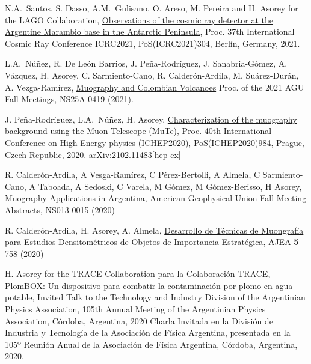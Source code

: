 \begin{etaremune}
\item {} N.A.\ Santos, S. Dasso, A.M.\ Gulisano, O. Areso, M. Pereira and H. Asorey for the LAGO Collaboration, \href{https://doi.org/10.22323/1.395.304}{Observations of the cosmic ray detector at the Argentine Marambio base in the Antarctic Peninsula}, \en Proc.
37th International Cosmic Ray Conference ICRC2021, PoS(ICRC2021)304, Berlín, Germany, 2021.

\item {} L.A.\ Núñez, R. De León Barrios, J. Peña-Rodríguez, J. Sanabria-Gómez, A. Vázquez, H. Asorey, C. Sarmiento-Cano, R. Calderón-Ardila, M. Suárez-Durán, A. Vezga-Ramírez, \href{https://ui.adsabs.harvard.edu/abs/2021AGUFMNS25A0419N}{Muography and Colombian Volcanoes} \in Proc. of the 2021 AGU Fall Meetings, NS25A-0419 (2021).

\item {} J. Peña-Rodríguez, L.A.\ Núñez, H. Asorey, \href{https://doi.org/10.22323/1.390.0984}{Characterization of the muography background using the Muon Telescope (MuTe)}, \en Proc.
40th International Conference on High Energy physics (ICHEP2020), PoS(ICHEP2020)984, Prague,  Czech Republic, 2020. \href{http://arxiv.org/abs/2102.11483}{arXiv:2102.11483}[hep-ex]

\item {} R. Calderón-Ardila, A Vesga-Ramírez, C Pérez-Bertolli, A Almela, C Sarmiento-Cano, A Taboada, A Sedoski, C Varela, M Gómez, M Gómez-Berisso, H Asorey, \href{https://ui.adsabs.harvard.edu/abs/2020AGUFMNS0130015C/abstract}{Muography Applications in Argentina}, American Geophysical Union Fall Meeting Abstracts, NS013-0015 (2020)

\item {} R. Calderón-Ardila, H. Asorey, A. Almela, \href{https://doi.org/10.33414/ajea.5.758.2020}{Desarrollo de Técnicas de Muongrafía para Estudios Densitométricos de Objetos de Importancia Estratégica}, AJEA {\textbf{5}} 758 (2020)

\item {} H. Asorey \ifeng for the TRACE Collaboration \else para la Colaboración TRACE\fi, PlomBOX: Un dispositivo para combatir la contaminación por plomo en agua potable, \ifeng Invited Talk to the Technology and Industry Division of the Argentinian Physics Association, 105th Annual Meeting of the Argentinian Physics Association, Córdoba, Argentina, 2020 \else Charla Invitada en la División de Industria y Tecnología de la Asociación de Física Argentina, presentada en la 105º Reunión Anual de la Asociación de Física Argentina, Córdoba, Argentina, 2020.\fi


\end{etaremune}
